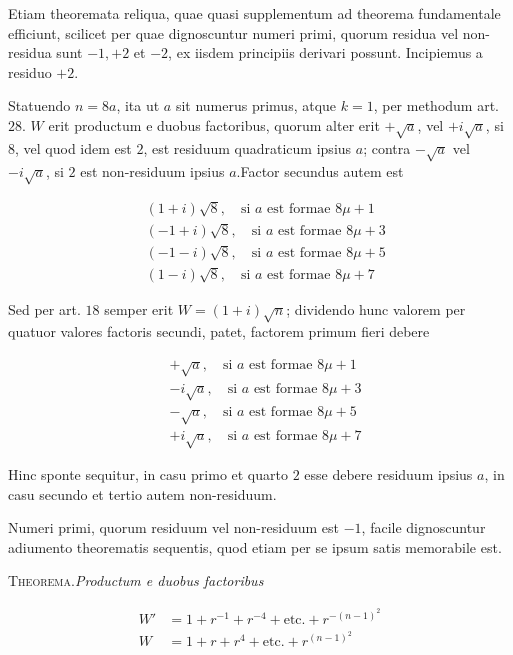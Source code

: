 
Etiam theoremata reliqua, quae quasi supplementum ad theorema fundamentale efficiunt, scilicet per quae dignoscuntur numeri primi, quorum residua vel non-residua sunt $-1,+2$ et $-2$, ex iisdem principiis derivari possunt. Incipiemus a residuo $+2$.

Statuendo $n=8a$, ita ut $a$ sit numerus primus, atque $k=1$, per methodum art. $28$. $W$ erit productum e duobus factoribus, quorum alter erit $+\surd a$, vel $+i\surd a$, si $8$, vel quod idem est $2$, est residuum quadraticum ipsius $a$; contra $-\surd a$ vel $-i\surd a$, si $2$ est non-residuum ipsius $a$.\quad Factor secundus autem est

\[
\begin{aligned}
&(1+i)\surd8,\quad\text{si }a\text{ est formae }8\mu+1\\
&(-1+i)\surd8,\quad\text{si }a\text{ est formae }8\mu+3\\
&(-1-i)\surd8,\quad\text{si }a\text{ est formae }8\mu+5\\
&(1-i)\surd8,\quad\text{si }a\text{ est formae }8\mu+7
\end{aligned}
\]

Sed per art. $18$ semper erit $W=(1+i)\surd n$; dividendo hunc valorem per quatuor valores factoris secundi, patet, factorem primum fieri debere

\[
\begin{aligned}
&+\surd a,\quad\text{si }a\text{ est formae }8\mu+1\\
&-i\surd a,\quad\text{si }a\text{ est formae }8\mu+3\\
&-\surd a,\quad\text{si }a\text{ est formae }8\mu+5\\
&+i\surd a,\quad\text{si }a\text{ est formae }8\mu+7
\end{aligned}
\]

Hinc sponte sequitur, in casu primo et quarto $2$ esse debere residuum ipsius $a$, in casu secundo et tertio autem non-residuum.



Numeri primi, quorum residuum vel non-residuum est $-1$, facile dignoscuntur adiumento theorematis sequentis, quod etiam per se ipsum satis memorabile est.

\textsc{Theorema.}\quad \textit{Productum e duobus factoribus}

\[
\begin{aligned}
W'&=1+r^{-1}+r^{-4}+\text{etc.}+r^{-(n-1)^2}\\
W&=1+r+r^4+\text{etc.}+r^{(n-1)^2}
\end{aligned}
\]

